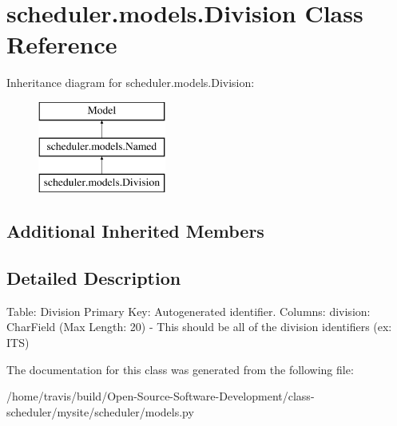\hypertarget{classscheduler_1_1models_1_1_division}{\section{scheduler.\-models.\-Division Class Reference}
\label{classscheduler_1_1models_1_1_division}
}
Inheritance diagram for scheduler.\-models.\-Division\-:\begin{figure}[H]
\begin{center}
\leavevmode
\includegraphics[height=3.000000cm]{classscheduler_1_1models_1_1_division}
\end{center}
\end{figure}
\subsection*{Additional Inherited Members}


\subsection{Detailed Description}
\begin{DoxyVerb}    Table: Division
    Primary Key: Autogenerated identifier.
    Columns: 
        division: CharField (Max Length: 20)
            - This should be all of the division identifiers (ex: ITS)
\end{DoxyVerb}
 

The documentation for this class was generated from the following file\-:\begin{DoxyCompactItemize}
\item 
/home/travis/build/\-Open-\/\-Source-\/\-Software-\/\-Development/class-\/scheduler/mysite/scheduler/models.\-py\end{DoxyCompactItemize}
